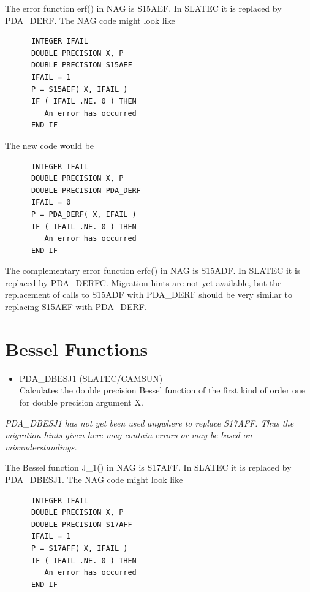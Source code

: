 \documentclass[11pt,twoside]{article}
\newcommand{\htmlref}[2]{#1}
\newcommand{\xlabel}[1]{}
\begin{document}
   The error function erf() in NAG is S15AEF. In SLATEC it is replaced
   by PDA\_DERF. The NAG code might look like

\begin{verbatim}
      INTEGER IFAIL
      DOUBLE PRECISION X, P
      DOUBLE PRECISION S15AEF
      IFAIL = 1
      P = S15AEF( X, IFAIL )
      IF ( IFAIL .NE. 0 ) THEN
         An error has occurred
      END IF
\end{verbatim}

   The new code would be

\begin{verbatim}
      INTEGER IFAIL
      DOUBLE PRECISION X, P
      DOUBLE PRECISION PDA_DERF
      IFAIL = 0
      P = PDA_DERF( X, IFAIL )
      IF ( IFAIL .NE. 0 ) THEN
         An error has occurred
      END IF
\end{verbatim}

   The complementary error function erfc() in NAG is S15ADF. In SLATEC
   it is replaced by PDA\_DERFC. Migration hints are not yet available,
   but the replacement of calls to S15ADF with PDA\_DERF should be very
   similar to replacing S15AEF with PDA\_DERF.


\section{\xlabel{bessel_functions}Bessel Functions}

\begin{itemize}

\item \htmlref{PDA\_DBESJ1}{PDA\_DBESJ1} (SLATEC/CAMSUN)\\
   Calculates the double precision Bessel function of the first kind
   of order one for double precision argument X.

\end{itemize}

{\em PDA\_DBESJ1 has not yet been used anywhere to replace S17AFF. Thus the
   migration hints given here may contain errors or may be based on
   misunderstandings.}

   The Bessel function J\_1() in NAG is S17AFF. In SLATEC it is replaced
   by PDA\_DBESJ1. The NAG code might look like

\begin{verbatim}
      INTEGER IFAIL
      DOUBLE PRECISION X, P
      DOUBLE PRECISION S17AFF
      IFAIL = 1
      P = S17AFF( X, IFAIL )
      IF ( IFAIL .NE. 0 ) THEN
         An error has occurred
      END IF
\end{verbatim}
\end{document}

